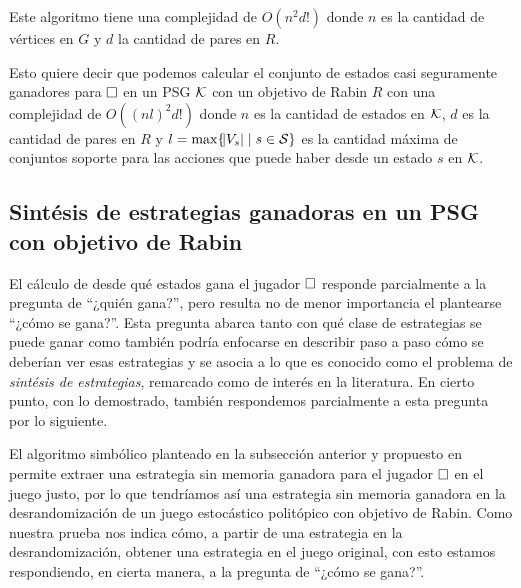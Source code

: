 Este algoritmo tiene una complejidad de $O(n^2 d!)$ donde $n$ es la cantidad de
vértices en $G$ y $d$ la cantidad de pares en $R$.

Esto quiere decir que podemos calcular el conjunto de estados casi seguramente
ganadores para $\square$ en un PSG $\mathcal{K}$ con un objetivo de Rabin $R$ con una
complejidad de $O((n l)^2 d! )$ donde $n$ es la cantidad de estados en $\mathcal{K}$,
$d$ es la cantidad de pares en $R$ y $l = \max \{\abs{V_s} \mid s \in \mathcal{S} \}$
es la cantidad máxima de conjuntos soporte para las acciones que puede haber
desde un estado $s$ en $\mathcal{K}$.

\subsection*{Sintésis de estrategias ganadoras en un PSG con objetivo de Rabin}

El cálculo de desde qué estados gana el jugador $\square$ responde parcialmente a
la pregunta de ``¿quién gana?'', pero resulta no de menor importancia el
plantearse ``¿cómo se gana?''. Esta pregunta abarca tanto con qué clase de
estrategias se puede ganar como también podría enfocarse en describir paso a
paso cómo se deberían ver esas estrategias y se asocia a lo que es conocido
como el problema de \textit{sintésis de estrategias}, remarcado como de interés
en la literatura. En cierto punto, con lo demostrado, también respondemos
parcialmente a esta pregunta por lo siguiente.

El algoritmo simbólico planteado en la subsección anterior y propuesto en
\cite{Banerjee} permite extraer una estrategia sin memoria ganadora para el
jugador $\square$ en el juego justo, por lo que tendríamos así una estrategia sin
memoria ganadora en la desrandomización de un juego estocástico politópico con
objetivo de Rabin. Como nuestra prueba nos indica cómo, a partir de una
estrategia en la desrandomización, obtener una estrategia en el juego original,
con esto estamos respondiendo, en cierta manera, a la pregunta de ``¿cómo se
gana?''.


